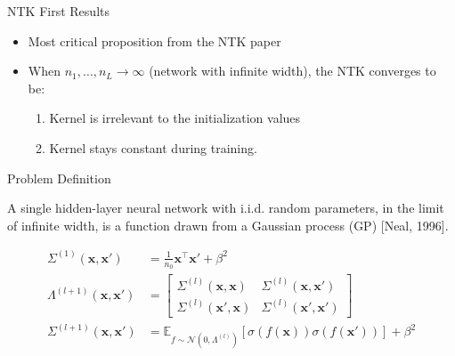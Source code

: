 \documentclass[serif, aspectratio=169]{beamer}
\begin{document}
\begin{frame}{NTK First Results}
	
	\begin{itemize}
		\item Most critical proposition from the NTK paper
		\item When \(n_1, \dots, n_L \to \infty\) (network with infinite width), the NTK converges to be:
		\begin{enumerate}
				\item Kernel is irrelevant to the initialization values
				
			\item  Kernel stays constant during training.
		\end{enumerate}
	
		
	\end{itemize}
\end{frame}


\begin{frame}{Problem Definition}
	
	
	A single hidden-layer neural network with i.i.d. random parameters, in the limit
	of infinite width, is a function drawn from a Gaussian process (GP) [Neal, 1996].
	
	\[
	\begin{aligned}
		\Sigma^{(1)}(\mathbf{x}, \mathbf{x}') &= \frac{1}{n_0}\mathbf{x}^\top{\mathbf{x}'} + \beta^2 \\
		\Lambda^{(l+1)}(\mathbf{x}, \mathbf{x}') &= \begin{bmatrix}
			\Sigma^{(l)}(\mathbf{x}, \mathbf{x}) & \Sigma^{(l)}(\mathbf{x}, \mathbf{x}') \\
			\Sigma^{(l)}(\mathbf{x}', \mathbf{x}) & \Sigma^{(l)}(\mathbf{x}', \mathbf{x}')
		\end{bmatrix} \\
		\Sigma^{(l+1)}(\mathbf{x}, \mathbf{x}') &= \mathbb{E}_{f \sim \mathcal{N}(0, \Lambda^{(l)})}[\sigma(f(\mathbf{x})) \sigma(f(\mathbf{x}'))] + \beta^2
	\end{aligned}
	\]
	
	
\end{frame}
\end{document}
